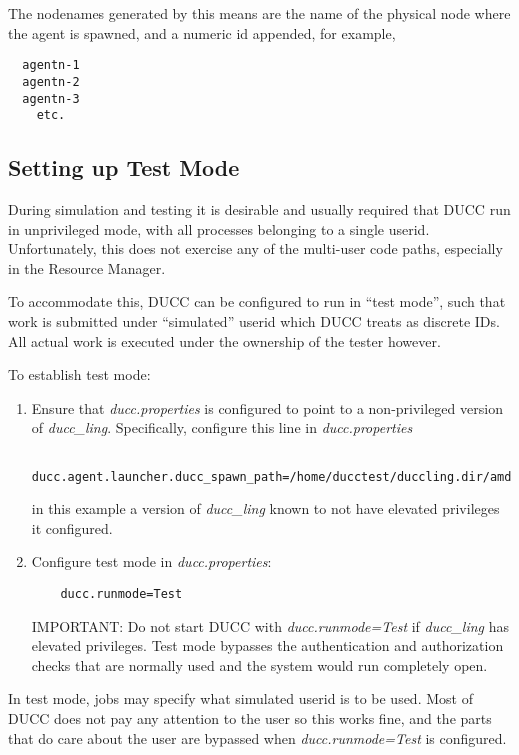       The nodenames generated by this means are the name of the physical node where
      the agent is spawned, and a numeric id appended, for example,
\begin{verbatim}
  agentn-1
  agentn-2
  agentn-3
    etc.
\end{verbatim}

      \subsection{Setting up Test Mode}

      During simulation and testing it is desirable and usually required that DUCC run
      in unprivileged mode, with all processes belonging to a single userid.  Unfortunately,
      this does not exercise any of the multi-user code paths, especially in the Resource
      Manager.

      To accommodate this, DUCC can be configured to run in ``test mode'', such that work
      is submitted under ``simulated'' userid which DUCC treats as discrete IDs.  All actual
      work is executed under the ownership of the tester however.

      To establish test mode:
      \begin{enumerate}
          \item Ensure that {\em ducc.properties} is configured to point to a non-privileged
            version of {\em ducc\_ling}.  Specifically, configure this line in {\em ducc.properties}
\begin{verbatim}
    ducc.agent.launcher.ducc_spawn_path=/home/ducctest/duccling.dir/amd64/ducc_ling
\end{verbatim}
            in this example a version of {\em ducc\_ling} known to not have elevated privileges
            it configured.
          \item Configure test mode in {\em ducc.properties}:
\begin{verbatim}
    ducc.runmode=Test
\end{verbatim}
            IMPORTANT: Do not start DUCC with {\em ducc.runmode=Test} if {\em ducc\_ling} has
            elevated privileges.  Test mode bypasses the authentication and authorization checks
            that are normally used and the system would run completely open.
      \end{enumerate}

      In test mode, jobs may specify what simulated userid is to be used.  Most of DUCC does not
      pay any attention to the user so this works fine, and the parts that do care about the
      user are bypassed when {\em ducc.runmode=Test} is configured.

